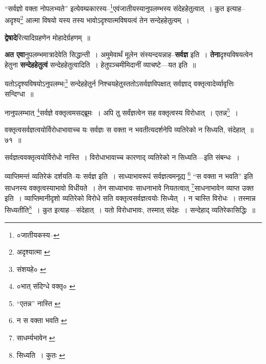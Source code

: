 \documentclass[article,12pt,a4paper]{memoir}
\begin{document}
	  \pstart “सर्वज्ञो वक्ता नोपलभ्यते” इत्येवम्प्रकारस्य--\footnote{०जातीयकस्य--\cite{dp-msB}}\-एवंजातीयस्यानुपलम्भस्य संदेहहेतुत्वात् । कुत इत्याह--अदृश्य\footnote{अदृश्यात्मा \cite{dp-msA} \cite{dp-msB} \cite{dp-edP} \cite{dp-edH} \cite{dp-edE} \cite{dp-edN}} आत्मा विषयो यस्य तस्य भावोऽदृश्यात्मविषयत्वं तेन सन्देहहेतुत्वम् ।
	\pend
      
	  \endgroup
	

	  \pstart \textbf{द्वेषादे}रित्यादिग्रहणेन मोहादेर्ग्रहणम् ॥
	\pend
      

	  \pstart \textbf{अत एवा}नुपलम्भमात्रादेवेति सिद्धान्ती । अमुमेवार्थं मूलेन संस्यन्दयन्नाह--\textbf{सर्वज्ञ} इति । \textbf{तेना}दृश्यविषयत्वेन हेतुना \textbf{सन्देहहेतुत्वं} सन्देहहेतुत्वादिति । हेतुपञ्चमीमिदानीं व्याचष्टे—यत इति ॥
	\pend
	  \bigskip
	  \begingroup
	

	  \pstart यतोऽदृश्यविषयोऽनुपलम्भः\footnote{संशयहे० \cite{dp-msA} \cite{dp-edP} \cite{dp-edH} \cite{dp-edE} \cite{dp-edN}} सन्देहहेतुर्न निश्चयहेतुस्ततोऽसर्वज्ञविपक्षात् सर्वज्ञाद् वक्तृत्वादेर्व्यावृत्तिः सन्दिग्धा ॥
	\pend
       

	  \pstart नानुपलम्भात् \footnote{०भात् संदिग्धे वक्तृ० \cite{dp-msB}}\-सर्वज्ञे वक्तृत्वमसद्ब्रूमः । अपि तु सर्वंज्ञत्वेन सह वक्तृत्वस्य विरोधात् । एतन्न\footnote{“एतन्न” नास्ति \cite{dp-edE}} ।
	\pend
       
	  \bigskip
	  \begingroup
	

	  \pstart वक्तृत्वसर्वज्ञत्वयोर्विरोधाभावाच्च यः सर्वज्ञः स वक्ता न भवतीत्यदर्शनेपि व्यतिरेको न सिध्यति, संदेहात् ॥ ७१ ॥
	\pend
      
	  \endgroup
	 

	  \pstart सर्वज्ञत्ववक्तृत्वयोर्विरोधो नास्ति । विरोधाभावाच्च कारणाद् व्यतिरेको न सिध्यति—इति संबन्धः ।
	\pend
       

	  \pstart व्याप्तिमन्तं व्यतिरेकं दर्शयति--यः सर्वज्ञ इति । साध्याभावरूपं सर्वज्ञत्वमनूद्य \footnote{न स वक्ता भवति \cite{dp-msA} \cite{dp-edP} \cite{dp-edH} \cite{dp-edE} \cite{dp-edN}} “स वक्ता न भवति” इति साधनस्य वक्तृत्वस्याभावो विधीयते । तेन साध्याभावः साधनाभावे नियतत्वात् \footnote{साधर्म्यभावेन \cite{dp-msB}}\-साधनाभावेन व्याप्त उक्त इति । व्याप्तिमानीदृशो व्यतिरेको विरोधे सति वक्तृत्वसर्वज्ञत्वयोः सिध्येत् । न चास्ति विरोधः । तस्मान्न सिध्यतीति\footnote{सिध्यति । कुतः \cite{dp-msA} \cite{dp-edP} \cite{dp-edH} \cite{dp-edE} \cite{dp-edN}} । कुत इत्याह—संदेहात् । यतो विरोधाभावः, तस्मात् संदेहः । सन्देहाद् व्यतिरेकासिद्धिः ॥
	\pend
       
\end{document}
